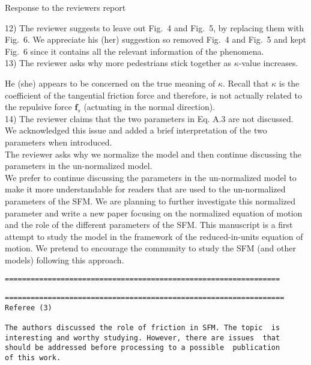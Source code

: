 \documentclass[a4paper,12pt]{letter}
\begin{document}
\begin{letter}{Response to the reviewers report}
{12) The reviewer suggests to leave out Fig.~4 and Fig.~5, by replacing them with Fig.~6. 
We appreciate his (her) suggestion so removed Fig.~4 and Fig.~5 and kept Fig.~6 since it
contains all the relevant information of the phenomena. \\

13) The reviewer asks why more pedestrians stick together as $\kappa$-value increases. 

He (she) appears to be concerned on the true meaning of $\kappa$. 
Recall that $\kappa$ is the coefficient of the tangential friction force and therefore,
is not actually related to the repulsive force $\mathbf{f}_s$ (actuating in the normal direction). \\

14) The reviewer claims that the two parameters in Eq. A.3 are not discussed.
We acknowledged this issue and added a brief interpretation of the two parameters when introduced.\\

The reviewer asks why we normalize the model and then continue discussing the parameters in the un-normalized model.\\

We prefer to continue discussing the parameters in the un-normalized model to make it more understandable for readers that are used to the un-normalized parameters of the SFM. We are planning to further investigate this normalized parameter and write a new paper focusing on the normalized equation of motion and the role of the different parameters of the SFM. This manuscript is a first attempt to study the model in the framework of the reduced-in-units equation of motion. We pretend to encourage the community to study the SFM (and other models) following this approach.


\begin{verbatim}
================================================================
\end{verbatim}

}

\newpage


\begin{verbatim}
=================================================================
Referee (3)

The authors discussed the role of friction in SFM. The topic  is 
interesting and worthy studying. However, there are issues  that 
should be addressed before processing to a possible  publication 
of this work.


\end{verbatim}
\end{letter}
\end{document}
